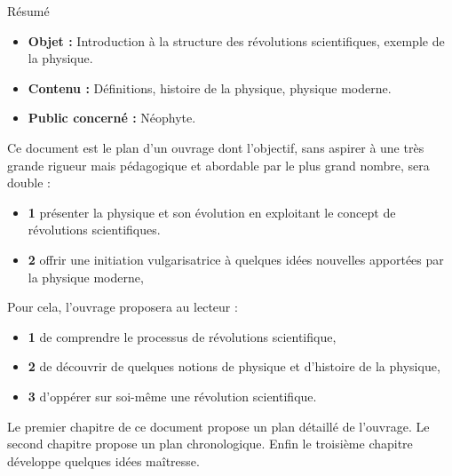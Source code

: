 \begin{center}
\Large
Résumé
\normalsize
\end{center}
\vspace{3cm}
\begin{itemize}[leftmargin=1cm, label=, itemsep=21pt]
\item {\bf Objet : } Introduction à la structure des révolutions scientifiques, exemple de la physique.
\item {\bf Contenu : } Définitions, histoire de la physique, physique moderne.
\item {\bf Public concerné : } Néophyte.
\end{itemize}

\vspace{3cm}

Ce document est le plan d'un ouvrage dont l'objectif, sans aspirer à une très grande rigueur mais pédagogique et abordable par le plus grand nombre, sera double :

\begin{itemize}[leftmargin=1cm, label=, itemsep=2pt]
\item {\bf 1 } présenter la physique et son évolution en exploitant le concept de révolutions scientifiques.
\item {\bf 2 } offrir une initiation vulgarisatrice à quelques idées nouvelles apportées par la physique moderne,
\end{itemize}

Pour cela, l'ouvrage proposera au lecteur :

\begin{itemize}[leftmargin=1cm, label=, itemsep=2pt]
\item {\bf 1 } de  comprendre le processus de révolutions scientifique,
\item {\bf 2 } de découvrir de quelques notions de physique et d'histoire de la physique,
\item {\bf 3 } d'oppérer sur soi-même une révolution scientifique.
\end{itemize}

Le premier chapitre de ce document propose un plan détaillé de l'ouvrage. Le second chapitre propose un plan chronologique. Enfin le troisième chapitre développe quelques idées maîtresse.



\vspace{3cm}

